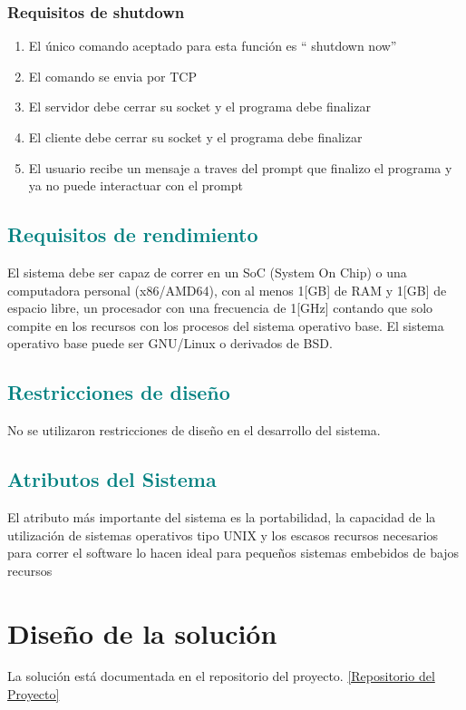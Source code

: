 \documentclass[fontsize=12pt]{article}
\begin{document}
\subsubsection{\textbf{Requisitos de shutdown}}
\begin{enumerate}
\item El único comando aceptado para esta función es “ shutdown now”
\item El comando se envia por TCP 
\item El servidor debe cerrar su socket y el programa debe finalizar
\item El cliente debe cerrar su socket y el programa debe finalizar
\item El usuario recibe un mensaje a traves del prompt que finalizo el programa y ya no puede interactuar con el prompt
\end{enumerate}

\subsection{\textcolor{teal}{\textbf{Requisitos de rendimiento}}}
El sistema debe ser capaz de correr en un SoC (System On Chip) o una computadora personal
(x86/AMD64), con al menos 1[GB] de RAM y 1[GB] de espacio libre, un procesador con
una frecuencia de 1[GHz] contando que solo compite en los recursos con los
procesos del sistema operativo base.
El sistema operativo base puede ser GNU/Linux o derivados de BSD.
\subsection{\textcolor{teal}{\textbf{Restricciones de diseño}}}
No se utilizaron restricciones de diseño en el desarrollo del sistema.
\subsection{\textcolor{teal}{\textbf{Atributos del Sistema}}}
El atributo más importante del sistema es la portabilidad, la capacidad de la
utilización de sistemas operativos tipo UNIX y los escasos recursos necesarios
para correr el software lo hacen ideal para pequeños sistemas embebidos de bajos
recursos
\section{\textbf{Diseño de la solución}} \label{diseno}
La solución está documentada en el repositorio del proyecto.
\href{https://github.com/martincasabella/OSII_2019}{[Repositorio del Proyecto]}
\end{document}
